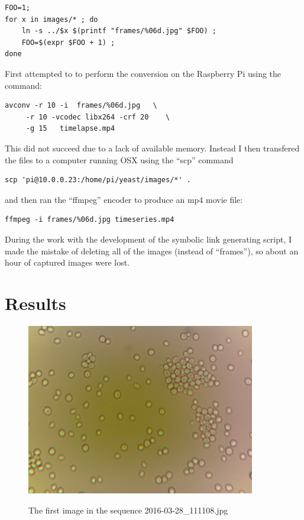 \documentclass[12pt]{article}
\begin{document}
\begin{lstlisting}[frame=single]
FOO=1; 
for x in images/* ; do 
    ln -s ../$x $(printf "frames/%06d.jpg" $FOO) ;
    FOO=$(expr $FOO + 1) ; 
done
\end{lstlisting}

First attempted to to perform the conversion on the Raspberry Pi using
the command:

\begin{lstlisting}[frame=single]
avconv -r 10 -i  frames/%06d.jpg   \
     -r 10 -vcodec libx264 -crf 20    \
     -g 15   timelapse.mp4 
\end{lstlisting}


This did not succeed due to a lack of available memory.  Instead I
then transfered the files to a computer running OSX using the ``scp''
command 

\begin{lstlisting}
scp 'pi@10.0.0.23:/home/pi/yeast/images/*' . 
\end{lstlisting}

and then ran the ``ffmpeg'' encoder to produce an mp4 movie file:

\begin{lstlisting}
ffmpeg -i frames/%06d.jpg timeseries.mp4 
\end{lstlisting}

During the work with the development of the symbolic link generating
script, I made the mistake of deleting all of the images (instead of
``frames''), so about an hour of captured images were lost.


\section{Results}

\begin{figure}[th]
\begin{center}
\includegraphics[width=10cm]{images/2016-03-28_111108.jpg}
\label{firstimage}
\caption{The first image in the sequence 2016-03-28\_111108.jpg}
\end{center}
\end{figure}
\end{document}
